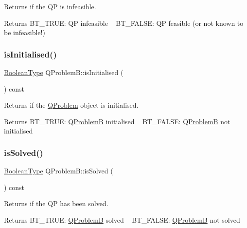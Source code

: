Returns if the QP is infeasible. \begin{DoxyReturn}{Returns}
B\+T\+\_\+\+T\+R\+UE\+: QP infeasible ~\newline
 B\+T\+\_\+\+F\+A\+L\+SE\+: QP feasible (or not known to be infeasible!) 
\end{DoxyReturn}
\mbox{\label{class_q_problem_b_ada1bc8c33c22ccc4ce6b9ca681098e44}} 
\subsubsection{\texorpdfstring{is\+Initialised()}{isInitialised()}}
{\footnotesize\ttfamily \hyperlink{_types_8hpp_a20f82124c82b6f5686a7fce454ef9089}{Boolean\+Type} Q\+Problem\+B\+::is\+Initialised (\begin{DoxyParamCaption}{ }\end{DoxyParamCaption}) const\hspace{0.3cm}{\ttfamily [inline]}}

Returns if the \hyperlink{class_q_problem}{Q\+Problem} object is initialised. \begin{DoxyReturn}{Returns}
B\+T\+\_\+\+T\+R\+UE\+: \hyperlink{class_q_problem_b}{Q\+ProblemB} initialised ~\newline
 B\+T\+\_\+\+F\+A\+L\+SE\+: \hyperlink{class_q_problem_b}{Q\+ProblemB} not initialised 
\end{DoxyReturn}
\mbox{\label{class_q_problem_b_a5c7b1368dde6de4c7c5858c400782044}} 
\subsubsection{\texorpdfstring{is\+Solved()}{isSolved()}}
{\footnotesize\ttfamily \hyperlink{_types_8hpp_a20f82124c82b6f5686a7fce454ef9089}{Boolean\+Type} Q\+Problem\+B\+::is\+Solved (\begin{DoxyParamCaption}{ }\end{DoxyParamCaption}) const\hspace{0.3cm}{\ttfamily [inline]}}

Returns if the QP has been solved. \begin{DoxyReturn}{Returns}
B\+T\+\_\+\+T\+R\+UE\+: \hyperlink{class_q_problem_b}{Q\+ProblemB} solved ~\newline
 B\+T\+\_\+\+F\+A\+L\+SE\+: \hyperlink{class_q_problem_b}{Q\+ProblemB} not solved 
\end{DoxyReturn}
\mbox{\label{class_q_problem_b_a869703c445e0eb4a324da44479c2d67f}} 

